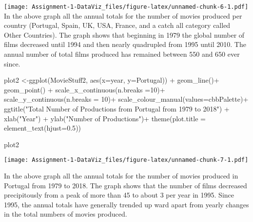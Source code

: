 \documentclass[
]{article}
\newenvironment{Shaded}{\begin{snugshade}}{\end{snugshade}}
\newcommand{\AttributeTok}[1]{\textcolor[rgb]{0.77,0.63,0.00}{#1}}
\newcommand{\DecValTok}[1]{\textcolor[rgb]{0.00,0.00,0.81}{#1}}
\newcommand{\FloatTok}[1]{\textcolor[rgb]{0.00,0.00,0.81}{#1}}
\newcommand{\FunctionTok}[1]{\textcolor[rgb]{0.00,0.00,0.00}{#1}}
\newcommand{\NormalTok}[1]{#1}
\newcommand{\OtherTok}[1]{\textcolor[rgb]{0.56,0.35,0.01}{#1}}
\newcommand{\SpecialCharTok}[1]{\textcolor[rgb]{0.00,0.00,0.00}{#1}}
\newcommand{\StringTok}[1]{\textcolor[rgb]{0.31,0.60,0.02}{#1}}
\begin{document}
\texttt{[image: Assignment-1-DataViz\_files/figure-latex/unnamed-chunk-6-1.pdf]}
In the above graph all the annual totals for the number of movies
produced per country (Portugal, Spain, UK, USA, France, and a catch all
category called Other Countries). The graph shows that beginning in 1979
the global number of films decreased until 1994 and then nearly
quadrupled from 1995 until 2010. The annual number of total films
produced has remained between 550 and 650 ever since.

\begin{Shaded}
\begin{Highlighting}[]
\NormalTok{plot2 }\OtherTok{\textless{}{-}}\FunctionTok{ggplot}\NormalTok{(MovieStuff2, }\FunctionTok{aes}\NormalTok{(}\AttributeTok{x=}\NormalTok{year, }\AttributeTok{y=}\NormalTok{Portugal)) }\SpecialCharTok{+} 
  \FunctionTok{geom\_line}\NormalTok{()}\SpecialCharTok{+}
  \FunctionTok{geom\_point}\NormalTok{() }\SpecialCharTok{+}
\FunctionTok{scale\_x\_continuous}\NormalTok{(}\AttributeTok{n.breaks =}\DecValTok{10}\NormalTok{)}\SpecialCharTok{+}
  \FunctionTok{scale\_y\_continuous}\NormalTok{(}\AttributeTok{n.breaks =} \DecValTok{10}\NormalTok{)}\SpecialCharTok{+}
  \FunctionTok{scale\_colour\_manual}\NormalTok{(}\AttributeTok{values=}\NormalTok{cbbPalette)}\SpecialCharTok{+}
  \FunctionTok{ggtitle}\NormalTok{(}\StringTok{"Total Number of Productions from Portugal from 1979 to 2018"}\NormalTok{) }\SpecialCharTok{+}
  \FunctionTok{xlab}\NormalTok{(}\StringTok{"Year"}\NormalTok{) }\SpecialCharTok{+} \FunctionTok{ylab}\NormalTok{(}\StringTok{"Number of Productions"}\NormalTok{)}\SpecialCharTok{+}
  \FunctionTok{theme}\NormalTok{(}\AttributeTok{plot.title =} \FunctionTok{element\_text}\NormalTok{(}\AttributeTok{hjust=}\FloatTok{0.5}\NormalTok{))}


\NormalTok{plot2}
\end{Highlighting}
\end{Shaded}

\texttt{[image: Assignment-1-DataViz\_files/figure-latex/unnamed-chunk-7-1.pdf]}

In the above graph all the annual totals for the number of movies
produced in Portugal from 1979 to 2018. The graph shows that the number
of films decreased precipitously from a peak of more than 45 to about 3
per year in 1995. Since 1995, the annual totals have generally trended
up ward apart from yearly changes in the total numbers of movies
produced.
\end{document}
